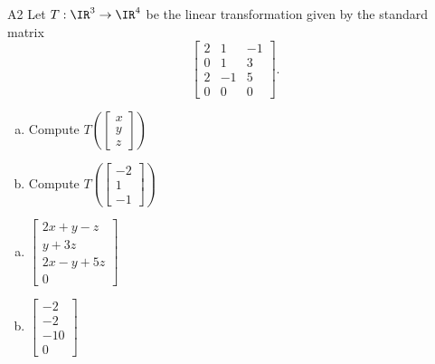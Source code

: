 \begin{problem}{A2}
Let $T: \IR^3\rightarrow \IR^4$ be the linear transformation given by the standard matrix
\[ \begin{bmatrix}
2 & 1 & -1 \\ 0 & 1 & 3 \\ 2 & -1 & 5 \\ 0 & 0 & 0
\end{bmatrix}. \]
\begin{enumerate}[(a)]
\item Compute \( T\left( \begin{bmatrix}x\\ y \\ z \end{bmatrix} \right) \)
\item Compute \(T\left( \begin{bmatrix} -2 \\ 1 \\ -1 \end{bmatrix}\right)\)
\end{enumerate}
\end{problem}
\begin{solution}
\begin{enumerate}[(a)]
\item \(\begin{bmatrix} 2x+y-z \\ y+3z \\ 2x-y+5z \\ 0 \end{bmatrix}\)
\item \(\begin{bmatrix} -2 \\ -2 \\ -10 \\ 0 \end{bmatrix}\)
\end{enumerate}
\end{solution}

